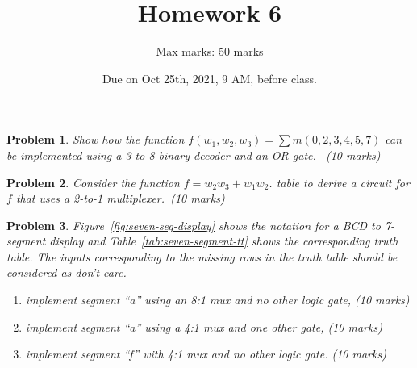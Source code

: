 \documentclass[twocolumn]{article}
\title{Homework 6}
\author{Max marks: 50 marks}
\date{Due on Oct 25th, 2021, 9 AM, before class.}
\newtheorem{prob}{Problem}
\begin{document}
\maketitle
\begin{prob}
  Show how the function $f (w_1 , w_2 , w_3 ) = \sum m(0, 2, 3, 4, 5, 7)$ can be implemented using a
  3-to-8 binary decoder and an OR gate.~\cite[Prob 4.1]{brown2013fundamentals}
  (10 marks)
\end{prob}

\begin{prob}
  Consider the function $f = w_2 w_3 + w_1 w_2$. table to derive a circuit for
  $f$ that uses a 2-to-1 multiplexer.~\cite[Prob 4.4]{brown2013fundamentals}(10 marks)
\end{prob}

\begin{prob}
  Figure~\ref{fig:seven-seg-display} shows the notation for a BCD to 7-segment
display and Table~\ref{tab:seven-segment-tt} shows the corresponding truth
table. The inputs corresponding to the missing rows in the truth table should be
considered as don't care.
  \begin{enumerate}
   \item implement segment ``a'' using an 8:1 mux and no other logic gate, (10 marks)
   \item implement segment ``a'' using a 4:1 mux and one other gate, (10 marks)
   \item implement segment ``f'' with 4:1 mux and no other logic gate. (10 marks)
  \end{enumerate}
\end{prob}
\end{document}
